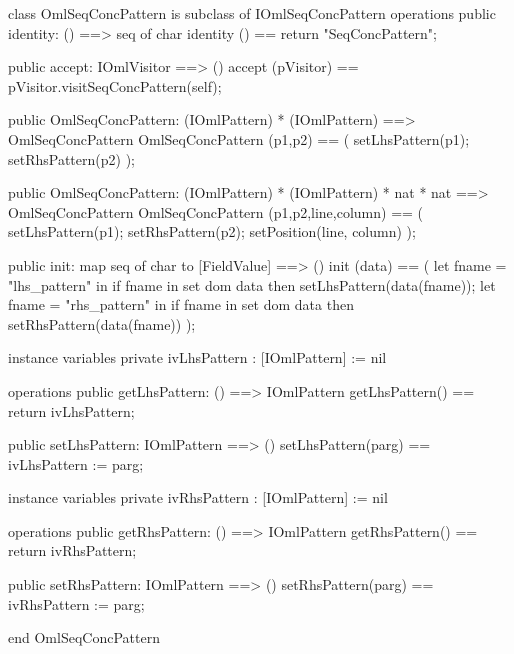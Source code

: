 \begin{vdm_al}
class OmlSeqConcPattern is subclass of IOmlSeqConcPattern
operations
  public identity: () ==> seq of char
  identity () == return "SeqConcPattern";

  public accept: IOmlVisitor ==> ()
  accept (pVisitor) == pVisitor.visitSeqConcPattern(self);

  public OmlSeqConcPattern:
    (IOmlPattern) *
    (IOmlPattern) ==> OmlSeqConcPattern
  OmlSeqConcPattern (p1,p2) == 
    ( setLhsPattern(p1);
      setRhsPattern(p2) );

  public OmlSeqConcPattern:
    (IOmlPattern) *
    (IOmlPattern) *
    nat *
    nat ==> OmlSeqConcPattern
  OmlSeqConcPattern (p1,p2,line,column) == 
    ( setLhsPattern(p1);
      setRhsPattern(p2);
      setPosition(line, column) );

  public init: map seq of char to [FieldValue] ==> ()
  init (data) ==
    ( let fname = "lhs_pattern" in
        if fname in set dom data
        then setLhsPattern(data(fname));
      let fname = "rhs_pattern" in
        if fname in set dom data
        then setRhsPattern(data(fname)) );

instance variables
  private ivLhsPattern : [IOmlPattern] := nil

operations
  public getLhsPattern: () ==> IOmlPattern
  getLhsPattern() == return ivLhsPattern;

  public setLhsPattern: IOmlPattern ==> ()
  setLhsPattern(parg) == ivLhsPattern := parg;

instance variables
  private ivRhsPattern : [IOmlPattern] := nil

operations
  public getRhsPattern: () ==> IOmlPattern
  getRhsPattern() == return ivRhsPattern;

  public setRhsPattern: IOmlPattern ==> ()
  setRhsPattern(parg) == ivRhsPattern := parg;

end OmlSeqConcPattern
\end{vdm_al}

